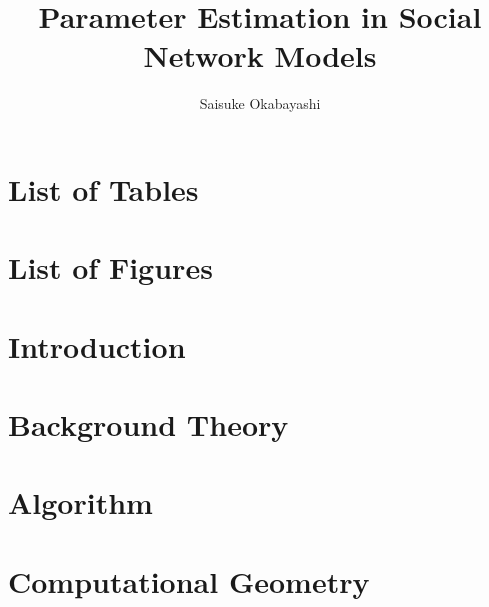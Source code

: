 \documentclass[oneside]{myumnStatThesis}
\author{Saisuke Okabayashi}
\title{Parameter Estimation in 
 Social Network Models}
\begin{document}
\makesignaturepage %
\maketitlepage %
\makecopyrightpage %
\frontmatter
\begin{acknowledgementspage} %
\end{acknowledgementspage}

\begin{abstract}

\end{abstract}

\tableofcontents %

\newpage
\chapter*{List of Tables}
{\def\chapter*#1{}
\listoftables}

\newpage
\chapter*{List of Figures}
{\def\chapter*#1{}
\listoffigures}


\mainmatter

\chapter{Introduction}


\chapter{Background Theory}\label{Chapter:Background}


\chapter{Algorithm}
 

\chapter{Computational Geometry} \label{Chapter:Linear programming}
 
%
\end{document}
